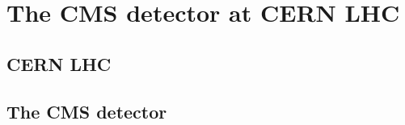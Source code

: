 \section{The CMS detector at CERN LHC}
\subsection{CERN LHC}
%

\subsection{The CMS detector}
%
%


%
%
